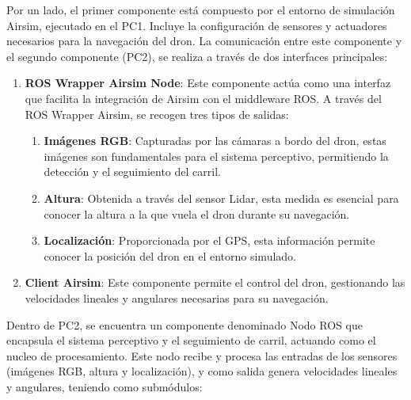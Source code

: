 Por un lado, el primer componente está compuesto por el entorno de simulación Airsim, ejecutado en el PC1. Incluye la configuración de sensores y actuadores necesarios 
para la navegación del dron. La comunicación entre este componente y el segundo componente (PC2), se realiza a través de dos interfaces principales: 

\begin{enumerate}
  \item \textbf{ROS Wrapper Airsim Node}: Este componente actúa como una interfaz que facilita la integración de Airsim con el middleware ROS. A través del ROS Wrapper Airsim, 
  se recogen tres tipos de salidas: 
    \begin{enumerate}
      \item \textbf{Imágenes RGB}: Capturadas por las cámaras a bordo del dron, estas imágenes son fundamentales para el sistema perceptivo, permitiendo la detección y el 
      seguimiento del carril.
      \item \textbf{Altura}: Obtenida a través del sensor Lidar, esta medida es esencial para conocer la altura a la que vuela el dron durante su navegación. 
      \item \textbf{Localización}: Proporcionada por el GPS, esta información permite conocer la posición del dron en el entorno simulado. 
    \end{enumerate}

  \item \textbf{Client Airsim}: Este componente permite el control del dron, gestionando las velocidades lineales y angulares necesarias para su navegación. 
\end{enumerate}

Dentro de PC2, se encuentra un componente denominado Nodo ROS que encapsula el sistema perceptivo y el seguimiento de carril, actuando como el nucleo de 
procesamiento. Este nodo recibe y procesa las entradas de los sensores (imágenes RGB, altura y localización), y como salida genera velocidades lineales y angulares, teniendo
como submódulos: 

